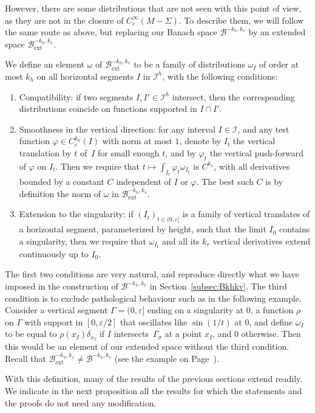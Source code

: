 \documentclass[JEP,XML,SOM,Unicode]{cedram}
\newcommand{\ext}{\mathrm{ext}}
\newcommand{\boI}{\mathcal{I}}
\newcommand{\boB}{\mathcal{B}}
\let\epsilon\varepsilon
\let\phi\varphi
\theoremstyle{definition}
\numberwithin{equation}{section}
\begin{document}
However, there are some distributions that are not seen with this point of
view, as they are not in the closure of $C^\infty_c(M-\Sigma)$. To describe
them, we will follow the same route as above, but replacing our Banach space
$\boB^{-k_h, k_v}$ by an extended space $\boB_{\ext}^{-k_h, k_v}$.

\enlargethispage{-2.5\baselineskip}%
We define an element $\omega$ of $\boB_{\ext}^{-k_h, k_v}$ to be a family of
distributions $\omega_I$ of order at most $k_h$ on all horizontal segments
$I$ in $\boI^h$, with the following conditions:
\begin{enumerate}
\item Compatibility: if two segments $I, I'\in \boI^h$ intersect, then the
corresponding distributions coincide on functions supported in $I\cap
I'$.
\item Smoothness in the vertical direction: for any interval $I \in \boI$,
and any test function $\phi \in C^{k_h}_c(I)$ with norm at most $1$,
denote by $I_t$ the vertical translation by $t$ of~$I$ for small enough
$t$, and by $\phi_t$ the vertical push-forward of $\phi$ on $I_t$. Then
we require that $t\mapsto \int_{I_t} \phi_t \omega_{I_t}$ is $C^{k_v}$,
with all derivatives bounded by a constant $C$ independent of $I$ or
$\phi$. The best such $C$ is by definition the norm of $\omega$ in
$\boB_{\ext}^{-k_h, k_v}$.
\item Extension to the singularity: if $(I_t)_{t \in (0,\epsilon]}$ is a
family of vertical translates of a horizontal segment, parameterized by
height, such that the limit $I_0$ contains a singularity, then we
require that $\omega_{I_t}$ and all its $k_v$ vertical derivatives
extend continuously up to $I_0$.
\end{enumerate}
The first two conditions are very natural, and reproduce directly what we
have imposed in the construction of $\boB^{-k_h, k_v}$ in
Section~\ref{subsec:Bkhkv}. The third condition is to exclude pathological
behaviour such as in the following example. Consider a vertical segment
$\Gamma= (0,\epsilon]$ ending on a singularity at $0$, a function $\rho$ on
$\Gamma$ with support in $[0,\epsilon/2]$ that oscillates like $\sin(1/t)$ at
$0$, and define $\omega_I$ to be equal to $\rho(x_I) \delta_{x_I}$ if $I$
intersects~$\Gamma_\sigma$ at a point $x_I$, and $0$ otherwise. Then this
would be an element of our extended space without the third condition. Recall
that $\boB_{\ext}^{-k_h, k_v} \neq \boB^{-k_h, k_v}$ (see the example on
Page~\pageref{page_B_ext_not_B}).

With this definition, many of the results of the previous sections extend
readily. We indicate in the next proposition all the results for which the
statements and the proofs do not need any modification.
\end{document}
